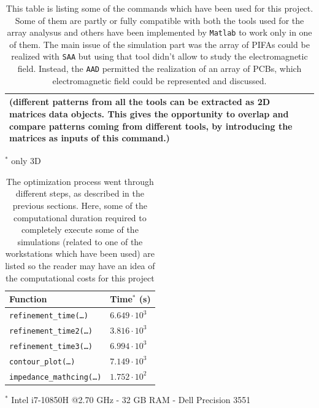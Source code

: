 \documentclass[10 pt,a4paper,twocolumn]{article}
\newcommand{\cmark}{\ding{51}}%
\begin{document}
{\begin{table}[bt!]
\begin{center}
{\begin{tabular}{|m{15.5cm}|c|c|}
			\small{{(different patterns from all the tools can be extracted as 2D matrices data objects. This gives the opportunity to overlap and compare patterns coming from different tools, by introducing the matrices as inputs of this command.)}} & \textcolor{ForestGreen}{\cmark} &  \textcolor{ForestGreen}{\cmark} \\
			\hline
	\end{tabular}}
\end{center}
	\footnotesize{$^*$ only 3D}
	\caption{This table is listing some of the commands which have been used for this project. Some of them are partly or fully compatible with both the tools used for the array analysus and others have been implemented by \texttt{Matlab} to work only in one of them. The main issue of the simulation part was the array of PIFAs could be realized with \texttt{SAA} but using that tool didn't allow to study the electromagnetic field. Instead, the \texttt{AAD} permitted the realization of an array of PCBs, which electromagnetic field could be represented and discussed.}
	\label{table:matlab commands}
\end{table} 

\begin{table}[bt!]
	\begin{center}
		{\selectfont
			\begin{tabular}{|m{5.4cm}|m{1.6cm}|}
				\hline
				\rowcolor{deepsaffron}\textbf{Function} & \textbf{Time$^*$} (s)  \\
			
				\hline
				\colorbox{backcolour}{\texttt{refinement\_time(\dots)}}	& $6.649\cdot 10^3$  \\
				\hline
				\colorbox{backcolour}{\texttt{refinement\_time2(\dots)}}	& $3.816\cdot 10^3$  \\
			\hline
				\colorbox{backcolour}{\texttt{refinement\_time3(\dots)}}	& $6.994\cdot 10^3$  \\
			\hline
				\colorbox{backcolour}{\texttt{contour\_plot(\dots)}}	& $7.149\cdot 10^3$  \\
			\hline
				\colorbox{backcolour}{\texttt{impedance\_mathcing(\dots)}}	& $1.752\cdot 10^2$  \\
			\hline

		\end{tabular}}
	\end{center}
	\tiny{$^*$ Intel i7-10850H @2.70 GHz - 32 GB RAM - Dell Precision 3551}
	\caption{The optimization process went through different steps, as described in the previous sections. Here, some of the computational duration required to completely execute some of the simulations (related to one of the workstations which have been used) are listed so the reader may have an idea of the computational costs for this project} 
	\label{table:time for functions}
\end{table} 

}
\end{document}
